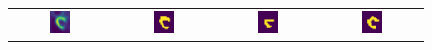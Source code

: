 \begin{figure}[htbp]
{\begin{tabular}{cccc}
\includegraphics[width=0.22\textwidth]{images/segs/coronal_input.png} &
\includegraphics[width=0.22\textwidth]{images/segs/coronal_gt.png} &
\includegraphics[width=0.22\textwidth]{images/segs/coronal_pred.png} &
\includegraphics[width=0.22\textwidth]{images/segs/coronal_pred_SP.png} \\


\end{tabular}}
\end{figure}
